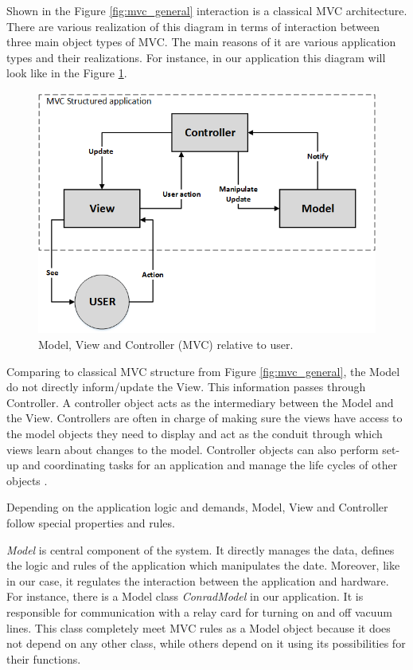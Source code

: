 Shown in the Figure \ref{fig:mvc_general} interaction is a classical MVC architecture. There are various realization of this diagram in terms of interaction between three main object types of MVC. The main reasons of it are various application types and their realizations. For instance, in our application this diagram will look like in the Figure \ref{fig:mvc_custom}.

\begin{figure}[ht]\centering
\includegraphics[width=0.7\linewidth]{Data/Control_Software/MVC_custom.png}
\caption{Model, View and Controller (MVC) relative to user.}
\label{fig:mvc_custom}
\end{figure}

Comparing to classical MVC structure from Figure \ref{fig:mvc_general}, the Model do not directly inform/update the View. This information passes through Controller. A controller object acts as the intermediary between the Model and the View. Controllers are often in charge of making sure the views have access to the model objects they need to display and act as the conduit through which views learn about changes to the model. Controller objects can also perform set-up and coordinating tasks for an application and manage the life cycles of other objects \cite{apple_MVC}.

Depending on the application logic and demands, Model, View and Controller follow special properties and rules.

\textit{Model} is central component of the system. It directly manages the data, defines the logic and rules of the application which manipulates the date. Moreover, like in our case, it regulates the interaction between the application and hardware. For instance, there is a Model class \textit{ConradModel} in our application. It is responsible for communication with a relay card for turning on and off vacuum lines. This class completely meet MVC rules as a Model object because it does not depend on any other class, while others depend on it using its possibilities for their functions.

